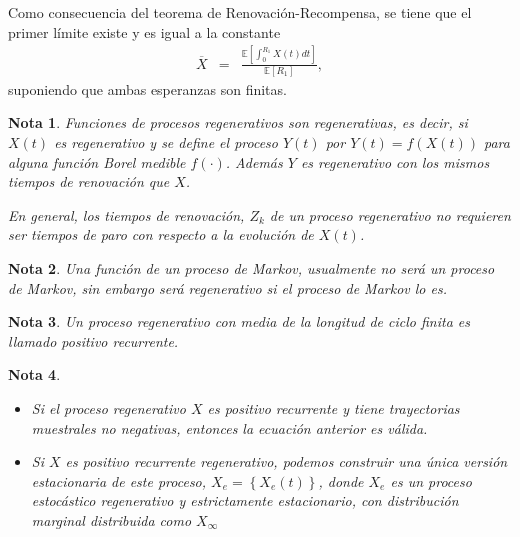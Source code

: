 \documentclass{article}
\newtheorem{Note}{Nota}[section]
\newcommand{\esp}{\mathbb{E}}
\numberwithin{equation}{section}
\begin{document}
Como consecuencia del teorema de Renovaci\'on-Recompensa, se tiene que el primer l\'imite  existe y es igual a la constante
\begin{eqnarray*}
\overline{X}&=&\frac{\esp\left[\int_{0}^{R_{1}}X\left(t\right)dt\right]}{\esp\left[R_{1}\right]},
\end{eqnarray*}
suponiendo que ambas esperanzas son finitas.
 
\begin{Note}
Funciones de procesos regenerativos son regenerativas, es decir, si $X\left(t\right)$ es regenerativo y se define el proceso $Y\left(t\right)$ por $Y\left(t\right)=f\left(X\left(t\right)\right)$ para alguna funci\'on Borel medible $f\left(\cdot\right)$. Adem\'as $Y$ es regenerativo con los mismos tiempos de renovaci\'on que $X$. 

En general, los tiempos de renovaci\'on, $Z_{k}$ de un proceso regenerativo no requieren ser tiempos de paro con respecto a la evoluci\'on de $X\left(t\right)$.
\end{Note} 

\begin{Note}
Una funci\'on de un proceso de Markov, usualmente no ser\'a un proceso de Markov, sin embargo ser\'a regenerativo si el proceso de Markov lo es.
\end{Note}

 
\begin{Note}
Un proceso regenerativo con media de la longitud de ciclo finita es llamado positivo recurrente.
\end{Note}


\begin{Note}
\begin{itemize}
\item[a)] Si el proceso regenerativo $X$ es positivo recurrente y tiene trayectorias muestrales no negativas, entonces la ecuaci\'on anterior es v\'alida.
\item[b)] Si $X$ es positivo recurrente regenerativo, podemos construir una \'unica versi\'on estacionaria de este proceso, $X_{e}=\left\{X_{e}\left(t\right)\right\}$, donde $X_{e}$ es un proceso estoc\'astico regenerativo y estrictamente estacionario, con distribuci\'on marginal distribuida como $X_{\infty}$
\end{itemize}
\end{Note}


\end{document}

